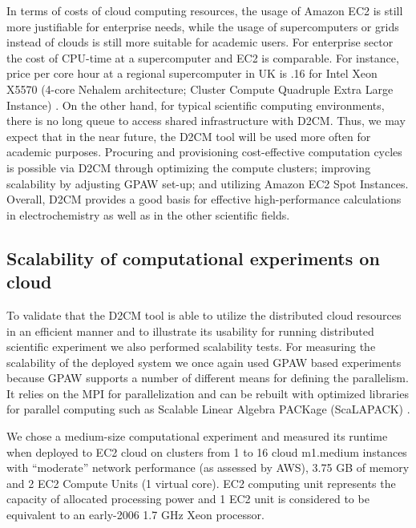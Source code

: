 \documentclass[a4paper,10pt]{article}
\begin{document}
In terms of costs of cloud computing resources, the usage of Amazon EC2 is still more justifiable for enterprise needs, while the usage of supercomputers or grids instead of clouds is still more suitable for academic users. For enterprise sector the cost of CPU-time at a supercomputer and EC2 is comparable. For instance, price per core hour at a regional supercomputer in UK is \0.16 for Intel Xeon X5570 (4-core Nehalem architecture; Cluster Compute Quadruple Extra Large Instance) \cite{amazon:price}. On the other hand, for typical scientific computing environments, there is no long queue to access shared infrastructure with D2CM. Thus, we may expect that in the near future, the D2CM tool will be used more often for academic purposes. Procuring and provisioning cost-effective computation cycles is possible via D2CM through optimizing the compute clusters; improving scalability by adjusting GPAW set-up; and utilizing Amazon EC2 Spot Instances. Overall, D2CM provides a good basis for effective high-performance calculations in electrochemistry as well as in the other scientific fields.









\subsection{Scalability of computational experiments on cloud}

To validate that the D2CM tool is able to utilize the distributed cloud resources in an efficient manner and to illustrate its usability for running distributed scientific experiment we also performed scalability tests. For measuring the scalability of the deployed system we once again used GPAW based experiments because GPAW supports a number of different means for defining the parallelism. It relies on the MPI for parallelization and can be rebuilt with optimized libraries for parallel computing such as Scalable Linear Algebra PACKage (ScaLAPACK) \cite{scalapack}.

We chose a medium-size computational experiment and measured its runtime when deployed to EC2 cloud on clusters from 1 to 16 cloud m1.medium instances with ``moderate'' network performance (as assessed by AWS), 3.75 GB of memory and 2 EC2 Compute
Units (1 virtual core). EC2 computing unit represents the capacity of allocated processing power and 1 EC2 unit is considered to be equivalent to an early-2006 1.7 GHz Xeon processor. 
\end{document}
